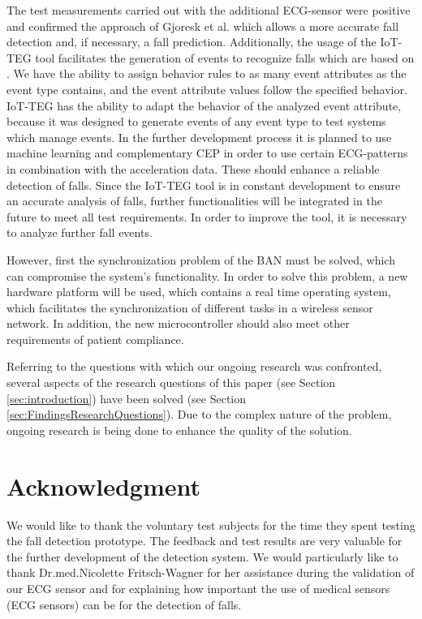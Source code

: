 \documentclass[review]{elsarticle}
\begin{document}
The test measurements carried out with the additional ECG-sensor were positive and confirmed the approach of Gjoresk et al. \cite{Gjoreski2014} which allows a more accurate fall detection and, if necessary, a fall prediction. Additionally, the usage of the IoT-TEG tool \cite{Gutierrez2017,TesisGutierrez2017} facilitates the generation of events to recognize falls which are based on \cite{Kozina}. We have the ability to assign behavior rules to as many event attributes as the event type contains, and the event attribute values follow the specified behavior. IoT-TEG \cite{Gutierrez2017,TesisGutierrez2017} has the ability to adapt the behavior of the analyzed event attribute, because it was designed to generate events of any event type to test systems which manage events. In the further development process it is planned to use machine learning and complementary CEP in order to use certain ECG-patterns in combination with the acceleration data. These should enhance a reliable detection of falls. Since the IoT-TEG tool \cite{Gutierrez2017,TesisGutierrez2017} is in constant development to ensure an accurate analysis of falls, further functionalities will be integrated in the future to meet all test requirements. In order to improve the tool, it is necessary to analyze further fall events.

However, first the synchronization problem of the BAN must be solved, which can compromise the system's functionality. In order to solve this problem, a new hardware platform will be used, which contains a real time operating system, which facilitates the synchronization of different tasks in a wireless sensor network. In addition, the new microcontroller should also meet other requirements of patient compliance.

Referring to the questions with which our ongoing research was confronted, several aspects of the research questions of this paper (see Section \ref{sec:introduction}) have been solved (see Section \ref{sec:FindingsResearchQuestions}). Due to the complex nature of the problem, ongoing research is being done to enhance the quality of the solution.

\section*{Acknowledgment}
We would like to thank the voluntary test subjects for the time they spent testing the fall detection prototype. The feedback and test results are very valuable for the further development of the detection system. We would particularly like to thank Dr.med.Nicolette Fritsch-Wagner for her assistance during the validation of our ECG sensor and for explaining how important the use of medical sensors (ECG sensors) can be for the detection of falls. 
\end{document}
